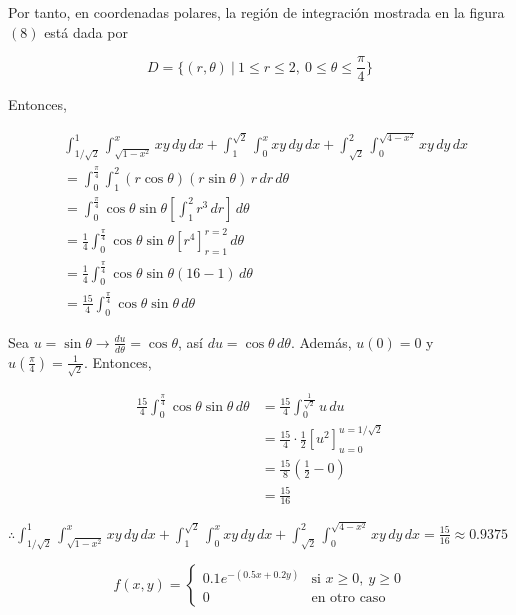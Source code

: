 \documentclass[12pt]{exam}
\begin{document}
\begin{questions}
  Por tanto, en coordenadas polares, la región de integración mostrada en la figura $(8)$ está dada por

  \[
  D = \{(r,\theta)~|~1\leq r\leq 2,~0\leq \theta \leq \frac{\pi}{4}\}
  \]

  Entonces,

  \begin{align*}
    &\int_{1/\sqrt{2}}^1\int_{\sqrt{1-x^2}}^x xy\,dy\,dx + \int_1^{\sqrt{2}}\int_0^x xy\,dy\,dx+\int_{\sqrt{2}}^2\int_0^{\sqrt{4-x^2}}xy\,dy\,dx \\
    &= \int_0^{\frac{\pi}{4}}\int_1^2 (r\cos{\theta})(r\sin{\theta})\,r\,dr\,d\theta\\
    &= \int_0^{\frac{\pi}{4}}\cos{\theta}\sin{\theta} \left[\int_1^2 r^3\,dr\right]\,d\theta\\
    &= \frac{1}{4}\int_0^{\frac{\pi}{4}}\cos{\theta}\sin{\theta} \left[r^4\right]_{r=1}^{r=2}\,d\theta\\
    &= \frac{1}{4}\int_0^{\frac{\pi}{4}}\cos{\theta}\sin{\theta} \left(16-1\right)\,d\theta\\
    &= \frac{15}{4}\int_0^{\frac{\pi}{4}}\cos{\theta}\sin{\theta}\,d\theta
  \end{align*}

  Sea $u=\sin{\theta} \rightarrow \frac{du}{d\theta}=\cos{\theta}$, así $du=\cos{\theta}\,d\theta$. Además, $u(0)=0$ y $u\left(\frac{\pi}{4}\right)=\frac{1}{\sqrt{2}}$. Entonces,

  \begin{align*}
    \frac{15}{4}\int_0^{\frac{\pi}{4}}\cos{\theta}\sin{\theta}\,d\theta
    &= \frac{15}{4}\int_0^{\frac{1}{\sqrt{2}}}u\,du \\
    &= \frac{15}{4}\cdot \frac{1}{2} \left[u^2\right]_{u=0}^{u=1/\sqrt{2}} \\
    &= \frac{15}{8}\left(\frac{1}{2}-0\right)\\
    &= \frac{15}{16}
  \end{align*}

  $\therefore \int_{1/\sqrt{2}}^1\int_{\sqrt{1-x^2}}^x xy\,dy\,dx + \int_1^{\sqrt{2}}\int_0^x xy\,dy\,dx+\int_{\sqrt{2}}^2\int_0^{\sqrt{4-x^2}}xy\,dy\,dx = \frac{15}{16} \approx 0.9375$

  
  \[
  f(x,y) =
  \begin{cases} 
    0.1e^{-(0.5x+0.2y)} & \text{si } x \geq 0,~y \geq 0 \\
    0 & \text{en otro caso}
  \end{cases}
  \]


\end{questions}
\end{document}
